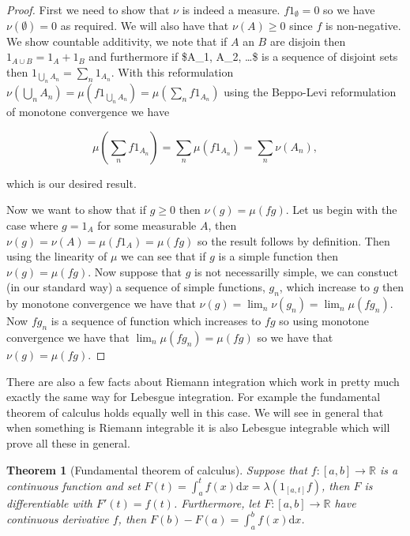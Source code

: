 \documentclass[
]{book}
\newtheorem{theorem}{Theorem}[chapter]
\theoremstyle{definition}
\theoremstyle{definition}
\theoremstyle{definition}
\theoremstyle{definition}
\theoremstyle{remark}
\begin{document}
\begin{proof}
First we need to show that \(\nu\) is indeed a measure. \(f1_\emptyset = 0\) so we have \(\nu(\emptyset) = 0\) as required. We will also have that \(\nu(A) \geq 0\) since \(f\) is non-negative. We show countable additivity, we note that if \(A\) an \(B\) are disjoin then \(1_{A \cup B} = 1_A + 1_B\) and furthermore if \$A\_1, A\_2, \dots \$ is a sequence of disjoint sets then \(1_{\bigcup_n A_n} = \sum_n 1_{A_n}\). With this reformulation \(\nu(\bigcup_n A_n) = \mu( f1_{\bigcup_n A_n}) = \mu ( \sum_n f1_{A_n})\) using the Beppo-Levi reformulation of monotone convergence we have

\[ \mu(\sum_n f1_{A_n} ) = \sum_n \mu(f1_{A_n}) = \sum_n \nu(A_n), \]

which is our desired result.

Now we want to show that if \(g \geq 0\) then \(\nu(g) = \mu(fg)\). Let us begin with the case where \(g=1_A\) for some measurable \(A\), then \(\nu(g) = \nu(A) = \mu(f1_A) = \mu(fg)\) so the result follows by definition. Then using the linearity of \(\mu\) we can see that if \(g\) is a simple function then \(\nu(g) = \mu(fg)\). Now suppose that \(g\) is not necessarilly simple, we can constuct (in our standard way) a sequence of simple functions, \(g_n\), which increase to \(g\) then by monotone convergence we have that \(\nu(g) = \lim_n \nu(g_n) = \lim_n \mu(f g_n)\). Now \(fg_n\) is a sequence of function which increases to \(fg\) so using monotone convergence we have that \(\lim_n \mu(f g_n) = \mu(fg)\) so we have that \(\nu(g) = \mu(fg)\).
\end{proof}

There are also a few facts about Riemann integration which work in pretty much exactly the same way for Lebesgue integration. For example the fundamental theorem of calculus holds equally well in this case. We will see in general that when something is Riemann integrable it is also Lebesgue integrable which will prove all these in general.

\begin{theorem}[Fundamental theorem of calculus]
Suppose that \(f: [a,b] \rightarrow \mathbb{R}\) is a continuous function and set \(F(t) = \int_a^t f(x) \mathrm{d}x = \lambda( 1_{[a,t]} f)\), then \(F\) is differentiable with \(F'(t) = f(t)\). Furthermore, let \(F: [a,b] \rightarrow \mathbb{R}\) have continuous derivative \(f\), then \(F(b) - F(a) = \int_a^b f(x) \mathrm{d}x\).
\end{theorem}
\end{document}
